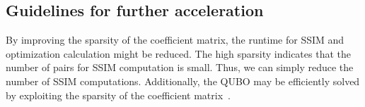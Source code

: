 
\subsection{Guidelines for further acceleration}
By improving the sparsity of the coefficient matrix, the runtime for SSIM and optimization calculation might be reduced. The high sparsity indicates that the number of pairs for SSIM computation is small. Thus, we can simply reduce the number of SSIM computations. Additionally, the QUBO may be efficiently solved by exploiting the sparsity of the coefficient matrix~\cite{Rehfeldt2023}.

